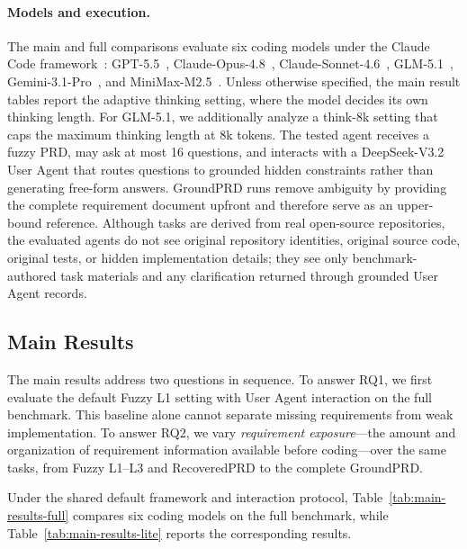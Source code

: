 \paragraph{Models and execution.}
The main \rcblite{} and full \rcb{} comparisons evaluate six coding models under the Claude Code framework~\cite{anthropic_claude_agent_sdk_2026}: GPT-5.5~\cite{singh2025openai}, Claude-Opus-4.8~\cite{anthropic_claude_opus_4_8_2026}, Claude-Sonnet-4.6~\cite{anthropic_claude_sonnet_4_6_2026}, GLM-5.1~\cite{zeng2026glm}, Gemini-3.1-Pro~\cite{google_deepmind_gemini_3_1_pro_2026}, and MiniMax-M2.5~\cite{chen2026minimax}. Unless otherwise specified, the main result tables report the adaptive thinking setting, where the model decides its own thinking length. For GLM-5.1, we additionally analyze a think-8k setting that caps the maximum thinking length at 8k tokens. The tested agent receives a fuzzy PRD, may ask at most 16 questions, and interacts with a DeepSeek-V3.2 User Agent that routes questions to grounded hidden constraints rather than generating free-form answers. GroundPRD runs remove ambiguity by providing the complete requirement document upfront and therefore serve as an upper-bound reference. Although tasks are derived from real open-source repositories, the evaluated agents do not see original repository identities, original source code, original tests, or hidden implementation details; they see only benchmark-authored task materials and any clarification returned through grounded User Agent records.

\subsection{Main Results}
\label{sec:main-results}

The main results address two questions in sequence. To answer RQ1, we first evaluate the default Fuzzy L1 setting with User Agent interaction on the full benchmark. This baseline alone cannot separate missing requirements from weak implementation. To answer RQ2, we vary \emph{requirement exposure}---the amount and organization of requirement information available before coding---over the same tasks, from Fuzzy L1--L3 and RecoveredPRD to the complete GroundPRD.

Under the shared default framework and interaction protocol, Table~\ref{tab:main-results-full} compares six coding models on the full benchmark, while Table~\ref{tab:main-results-lite} reports the corresponding \rcblite{} results.

